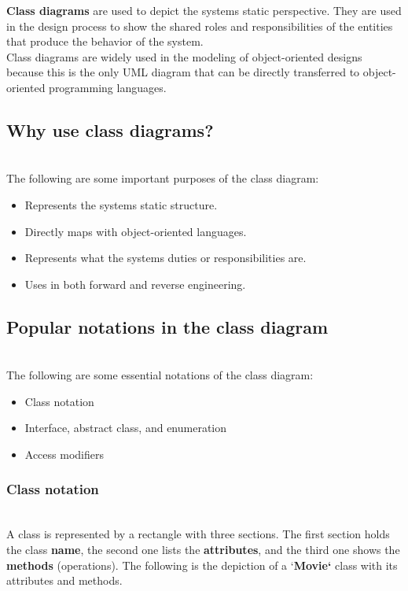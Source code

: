 

\textbf{Class diagrams} are used to depict the system\textquotesingle s static perspective. They are used in the design process to show the shared roles and responsibilities of the entities that produce the behavior of the system.
\\
Class diagrams are widely used in the modeling of object-oriented designs because this is the only UML diagram that can be directly transferred to object-oriented programming languages.

\subsection{Why use class diagrams?}\label{why-use-class-diagrams}
\\
The following are some important purposes of the class diagram:

\begin{itemize}
\item
Represents the system\textquotesingle s static structure.
\item
Directly maps with object-oriented languages.
\item
Represents what the system\textquotesingle s duties or responsibilities are.
\item
Uses in both forward and reverse engineering.
\end{itemize}

\subsection{Popular notations in the class diagram}\label{popular-notations-in-the-class-diagram}
\\
The following are some essential notations of the class diagram:

\begin{itemize}
\item
Class notation
\item
Interface, abstract class, and enumeration
\item
Access modifiers
\end{itemize}

\subsubsection{Class notation}\label{class-notation}
\\
A class is represented by a rectangle with three sections. The first section holds the class \textbf{name}, the second one lists the \textbf{attributes}, and the third one shows the \textbf{methods} (operations). The following is the depiction of a `\textbf{Movie`} class with its attributes and methods.


